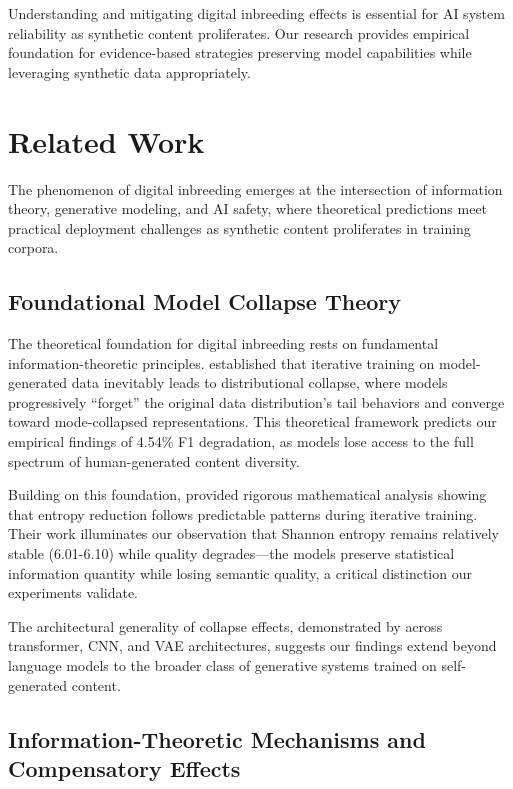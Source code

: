 \documentclass{article}
\begin{document}
Understanding and mitigating digital inbreeding effects is essential for AI system reliability as synthetic content proliferates. Our research provides empirical foundation for evidence-based strategies preserving model capabilities while leveraging synthetic data appropriately.

\section{Related Work}

The phenomenon of digital inbreeding emerges at the intersection of information theory, generative modeling, and AI safety, where theoretical predictions meet practical deployment challenges as synthetic content proliferates in training corpora.

\subsection{Foundational Model Collapse Theory}

The theoretical foundation for digital inbreeding rests on fundamental information-theoretic principles. \citet{shumailov2023curse} established that iterative training on model-generated data inevitably leads to distributional collapse, where models progressively ``forget'' the original data distribution's tail behaviors and converge toward mode-collapsed representations. This theoretical framework predicts our empirical findings of 4.54\% F1 degradation, as models lose access to the full spectrum of human-generated content diversity.

Building on this foundation, \citet{seddik2024bad} provided rigorous mathematical analysis showing that entropy reduction follows predictable patterns during iterative training. Their work illuminates our observation that Shannon entropy remains relatively stable (6.01-6.10) while quality degrades—the models preserve statistical information quantity while losing semantic quality, a critical distinction our experiments validate.

The architectural generality of collapse effects, demonstrated by \citet{alemohammad2023self} across transformer, CNN, and VAE architectures, suggests our findings extend beyond language models to the broader class of generative systems trained on self-generated content.

\subsection{Information-Theoretic Mechanisms and Compensatory Effects}
\end{document}
